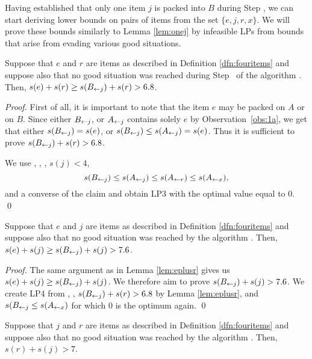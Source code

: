 Having established that only one item $j$ is packed into $B$ during
Step , we can start deriving lower bounds on pairs of
items from the set $\{e,j,r,x\}$. We will prove these bounds similarly
to Lemma \ref{lem:onej} by infeasible LPs from bounds that arise from
evading various good situations.

\begin{lem}\label{lem:eplusr}
Suppose that $e$ and $r$ are items as described in Definition \ref{dfn:fouritems} and suppose
also that no good situation was reached during Step~{\rm {}} of the algorithm \tbalg.
Then, $s(e) + s(r) \ge  s(B_{\leftarrow j}) + s(r) > 6.8$.
\end{lem}

\begin{proof}
First of all, it is important to note that the item $e$ may be
packed on $A$ or on $B$.
Since either $B_{\leftarrow j}$, or $A_{\leftarrow j}$ contains solely $e$
by Observation~\ref{obs:1a}, we get that either $s(B_{\leftarrow j}) = s(e)$,
or $s(B_{\leftarrow j}) \le s(A_{\leftarrow j}) = s(e)$. Thus it is sufficient to prove
$s(B_{\leftarrow j}) + s(r) > 6.8$.

We use , , , $s(j) < 4$, \[s(B_{\leftarrow j}) \le s(A_{\leftarrow j}) \le s(A_{\leftarrow r}) \le s(A_{\leftarrow x}),\]
and a converse of the claim and obtain LP3 with the optimal value equal to 0. \qed
\end{proof}

\begin{lem}\label{lem:eplusj}
Suppose that $e$ and $j$ are items as described in Definition \ref{dfn:fouritems} and suppose
also that no good situation was reached by the algorithm \tbalg.
Then, $s(e) + s(j) \ge  s(B_{\leftarrow j}) + s(j) > 7.6$.
\end{lem}

\begin{proof}
The same argument as in Lemma \ref{lem:eplusr} gives us $s(e) + s(j) \ge  s(B_{\leftarrow j}) + s(j)$.
We therefore aim to prove $s(B_{\leftarrow j}) + s(j) > 7.6$. 
We create LP4 from , , $s(B_{\leftarrow j}) + s(r) > 6.8$ by Lemma \ref{lem:eplusr},
and $s(B_{\leftarrow j} \leq s(A_{\leftarrow x})$ for which 0 is the optimum again.
\qed
\end{proof}

\begin{lem}\label{lem:rplusj}
Suppose that $j$ and $r$ are items as described in Definition \ref{dfn:fouritems} and suppose
also that no good situation was reached by the algorithm \tbalg. Then, $s(r) + s(j) > 7$.
\end{lem}

